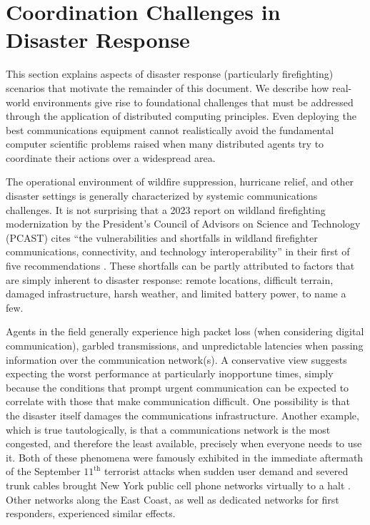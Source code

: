 \documentclass[]             %
{NASA}                       %
\theoremstyle{definition}
\begin{document}
\section{Coordination Challenges in Disaster Response}
\label{sec:disaster-response}

This section explains aspects of disaster response (particularly
firefighting) scenarios that motivate the remainder of this
document. We describe how real-world environments give rise to
foundational challenges that must be addressed through the application
of distributed computing principles. Even deploying the best
communications equipment cannot realistically avoid the fundamental
computer scientific problems raised when many distributed agents try
to coordinate their actions over a widespread area.

The operational environment of wildfire suppression, hurricane relief,
and other disaster settings is generally characterized by systemic
communications challenges. It is not surprising that a 2023 report on
wildland firefighting modernization by the President’s Council of
Advisors on Science and Technology (PCAST) cites ``the vulnerabilities
and shortfalls in wildland firefighter communications, connectivity,
and technology interoperability'' in their first of five
recommendations \cite{pcast2023}. These shortfalls can be partly
attributed to factors that are simply inherent to disaster response:
remote locations, difficult terrain, damaged infrastructure, harsh
weather, and limited battery power, to name a few.

Agents in the field generally experience high packet loss (when
considering digital communication), garbled transmissions, and
unpredictable latencies when passing information over the
communication network(s). A conservative view suggests expecting the
worst performance at particularly inopportune times, simply because
the conditions that prompt urgent communication can be expected to
correlate with those that make communication difficult. One
possibility is that the disaster itself damages the communications
infrastructure.  Another example, which is true tautologically, is
that a communications network is the most congested, and therefore the
least available, precisely when everyone needs to use it. Both of
these phenomena were famously exhibited in the immediate aftermath of
the September $11^\textrm{th}$ terrorist attacks when sudden user
demand and severed trunk cables brought New York public cell phone
networks virtually to a halt \cite{2011:Reardon}. Other networks along
the East Coast, as well as dedicated networks for first responders,
experienced similar effects.
\end{document}
